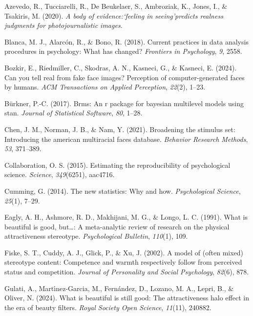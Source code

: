 \documentclass[
  jou,
  floatsintext,
  longtable,
  nolmodern,
  notxfonts,
  notimes,
  colorlinks=true,linkcolor=blue,citecolor=blue,urlcolor=blue]{apa7}
\newlength{\cslhangindent}
\newenvironment{CSLReferences}[2] %
 {\begin{list}{}{%
  \setlength{\itemindent}{0pt}
  \setlength{\leftmargin}{0pt}
  \setlength{\parsep}{0pt}
  \ifodd #1
   \setlength{\leftmargin}{\cslhangindent}
   \setlength{\itemindent}{-1\cslhangindent}
  \fi
  \setlength{\itemsep}{#2\baselineskip}}}
 {\end{list}}
\begin{document}
\label{refs}
\begin{CSLReferences}{1}{0}
Azevedo, R., Tucciarelli, R., De Beukelaer, S., Ambroziak, K., Jones,
I., \& Tsakiris, M. (2020). \emph{A body of evidence:`feeling in
seeing'predicts realness judgments for photojournalistic images.}

Blanca, M. J., Alarcón, R., \& Bono, R. (2018). Current practices in
data analysis procedures in psychology: What has changed?
\emph{Frontiers in Psychology}, \emph{9}, 2558.

Bozkir, E., Riedmiller, C., Skodras, A. N., Kasneci, G., \& Kasneci, E.
(2024). Can you tell real from fake face images? Perception of
computer-generated faces by humans. \emph{ACM Transactions on Applied
Perception}, \emph{22}(2), 1--23.

Bürkner, P.-C. (2017). Brms: An r package for bayesian multilevel models
using stan. \emph{Journal of Statistical Software}, \emph{80}, 1--28.

Chen, J. M., Norman, J. B., \& Nam, Y. (2021). Broadening the stimulus
set: Introducing the american multiracial faces database. \emph{Behavior
Research Methods}, \emph{53}, 371--389.

Collaboration, O. S. (2015). Estimating the reproducibility of
psychological science. \emph{Science}, \emph{349}(6251), aac4716.

Cumming, G. (2014). The new statistics: Why and how. \emph{Psychological
Science}, \emph{25}(1), 7--29.

Eagly, A. H., Ashmore, R. D., Makhijani, M. G., \& Longo, L. C. (1991).
What is beautiful is good, but\ldots: A meta-analytic review of research
on the physical attractiveness stereotype. \emph{Psychological
Bulletin}, \emph{110}(1), 109.

Fiske, S. T., Cuddy, A. J., Glick, P., \& Xu, J. (2002). A model of
(often mixed) stereotype content: Competence and warmth respectively
follow from perceived status and competition. \emph{Journal of
Personality and Social Psychology}, \emph{82}(6), 878.

Gulati, A., Martı́nez-Garcia, M., Fernández, D., Lozano, M. A., Lepri,
B., \& Oliver, N. (2024). What is beautiful is still good: The
attractiveness halo effect in the era of beauty filters. \emph{Royal
Society Open Science}, \emph{11}(11), 240882.


\end{CSLReferences}
\end{document}
